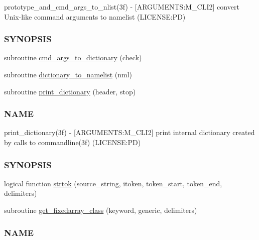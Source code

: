 \begin{DoxyCompactItemize}
\begin{DoxyCompactList}
prototype\+\_\+and\+\_\+cmd\+\_\+args\+\_\+to\+\_\+nlist(3f) -\/ \mbox{[}A\+R\+G\+U\+M\+E\+N\+TS\+:M\+\_\+\+C\+L\+I2\mbox{]} convert Unix-\/like command arguments to namelist (L\+I\+C\+E\+N\+SE\+:PD) \subsubsection*{S\+Y\+N\+O\+P\+S\+IS}\end{DoxyCompactList}\item 
subroutine \mbox{\hyperlink{namespacem__cli2_a3348b0c76dadd62c536e06f82bcb0331}{cmd\+\_\+args\+\_\+to\+\_\+dictionary}} (check)
\item 
subroutine \mbox{\hyperlink{namespacem__cli2_ab43e4e37723a0acc2183fbbf3d8c36bd}{dictionary\+\_\+to\+\_\+namelist}} (nml)
\item 
subroutine \mbox{\hyperlink{namespacem__cli2_acbd726aa5c13b005a14c06d58915cb9a}{print\+\_\+dictionary}} (header, stop)
\begin{DoxyCompactList}\small\item\em \subsubsection*{N\+A\+ME}

print\+\_\+dictionary(3f) -\/ \mbox{[}A\+R\+G\+U\+M\+E\+N\+TS\+:M\+\_\+\+C\+L\+I2\mbox{]} print internal dictionary created by calls to commandline(3f) (L\+I\+C\+E\+N\+SE\+:PD) \subsubsection*{S\+Y\+N\+O\+P\+S\+IS}\end{DoxyCompactList}\item 
logical function \mbox{\hyperlink{namespacem__cli2_a752fd074abce57e636e4572b3e55db3a}{strtok}} (source\+\_\+string, itoken, token\+\_\+start, token\+\_\+end, delimiters)
\item 
subroutine \mbox{\hyperlink{namespacem__cli2_a6d8c1c441ac15f9a2882e50459d39565}{get\+\_\+fixedarray\+\_\+class}} (keyword, generic, delimiters)
\begin{DoxyCompactList}\small\item\em \subsubsection*{N\+A\+ME}


\end{DoxyCompactList}
\end{DoxyCompactItemize}
